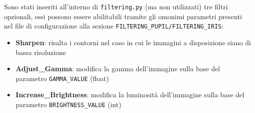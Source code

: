 Sono stati inseriti all’interno di \texttt{filtering.py} (ma non utilizzati) tre filtri opzionali, essi possono essere abilitabili tramite gli omonimi parametri presenti nel file di configurazione alla sezione \texttt{FILTERING\_PUPIL/FILTERING\_IRIS}:

\begin{itemize}
  \item \textbf{Sharpen}: risalta i contorni nel caso in cui le immagini a disposizione siano di bassa risoluzione
  \item \textbf{Adjust\_Gamma}: modifica la gamma dell’immagine sulla base del parametro \texttt{GAMMA\_VALUE} (float)
  \item \textbf{Increase\_Brightness}: modifica la luminosità dell’immagine sulla base del parametro \texttt{BRIGHTNESS\_VALUE} (int)
\end{itemize}
